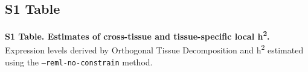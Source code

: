 \documentclass[10pt,letterpaper]{article}
\begin{document}
\subsection*{S1 Table}
\label{S1_Table}
{\bf S1 Table. Estimates of cross-tissue and tissue-specific local h\textsuperscript{2}.} Expression levels derived by Orthogonal Tissue Decomposition and h\textsuperscript{2} estimated using the \texttt{--reml-no-constrain} method.
\end{document}
